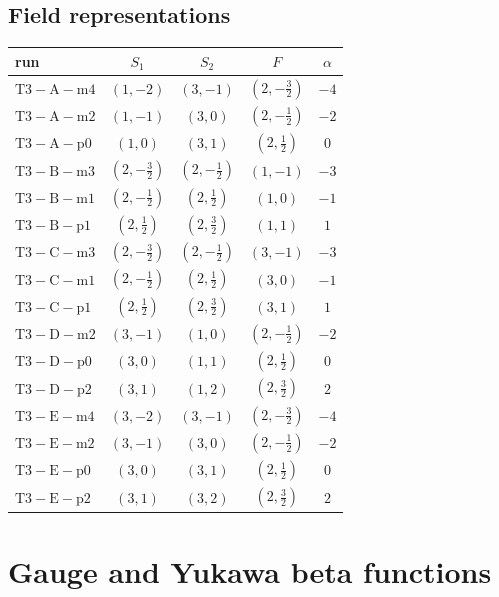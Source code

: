 \documentclass[9pt]{article}
\begin{document}
\subsection*{Field representations}
\begin{longtable}{@{}lcccc@{}}
\toprule
run & $S_1$ & $S_2$ & $F$ & $\alpha$ \\
\midrule
$\mathrm{T3-A-m4}$ & $(1,-2)$ & $(3,-1)$ & $(2,- \frac{3}{2})$ & $-4$ \\
$\mathrm{T3-A-m2}$ & $(1,-1)$ & $(3,0)$ & $(2,- \frac{1}{2})$ & $-2$ \\
$\mathrm{T3-A-p0}$ & $(1,0)$ & $(3,1)$ & $(2,\frac{1}{2})$ & $0$ \\
$\mathrm{T3-B-m3}$ & $(2,- \frac{3}{2})$ & $(2,- \frac{1}{2})$ & $(1,-1)$ & $-3$ \\
$\mathrm{T3-B-m1}$ & $(2,- \frac{1}{2})$ & $(2,\frac{1}{2})$ & $(1,0)$ & $-1$ \\
$\mathrm{T3-B-p1}$ & $(2,\frac{1}{2})$ & $(2,\frac{3}{2})$ & $(1,1)$ & $1$ \\
$\mathrm{T3-C-m3}$ & $(2,- \frac{3}{2})$ & $(2,- \frac{1}{2})$ & $(3,-1)$ & $-3$ \\
$\mathrm{T3-C-m1}$ & $(2,- \frac{1}{2})$ & $(2,\frac{1}{2})$ & $(3,0)$ & $-1$ \\
$\mathrm{T3-C-p1}$ & $(2,\frac{1}{2})$ & $(2,\frac{3}{2})$ & $(3,1)$ & $1$ \\
$\mathrm{T3-D-m2}$ & $(3,-1)$ & $(1,0)$ & $(2,- \frac{1}{2})$ & $-2$ \\
$\mathrm{T3-D-p0}$ & $(3,0)$ & $(1,1)$ & $(2,\frac{1}{2})$ & $0$ \\
$\mathrm{T3-D-p2}$ & $(3,1)$ & $(1,2)$ & $(2,\frac{3}{2})$ & $2$ \\
$\mathrm{T3-E-m4}$ & $(3,-2)$ & $(3,-1)$ & $(2,- \frac{3}{2})$ & $-4$ \\
$\mathrm{T3-E-m2}$ & $(3,-1)$ & $(3,0)$ & $(2,- \frac{1}{2})$ & $-2$ \\
$\mathrm{T3-E-p0}$ & $(3,0)$ & $(3,1)$ & $(2,\frac{1}{2})$ & $0$ \\
$\mathrm{T3-E-p2}$ & $(3,1)$ & $(3,2)$ & $(2,\frac{3}{2})$ & $2$ \\
\bottomrule
\end{longtable}
\section*{Gauge and Yukawa beta functions}
\end{document}
